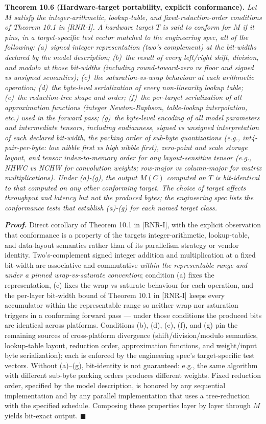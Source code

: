 \documentclass[
]{article}
\begin{document}
\textbf{Theorem 10.6 (Hardware-target portability, explicit
conformance).} \emph{Let $M$ satisfy the integer-arithmetic,
lookup-table, and fixed-reduction-order conditions of Theorem 10.1 in [RNR-I].
A hardware target $T$ is said to \emph{conform} for $M$ if it pins,
in a target-specific test vector matched to the engineering spec,
all of the following: (a)~signed integer representation (two's
complement) at the bit-widths declared by the model description;
(b)~the result of every left/right shift, division, and modulo at
those bit-widths (including round-toward-zero vs floor and signed
vs unsigned semantics); (c)~the saturation-vs-wrap behaviour at each
arithmetic operation; (d)~the byte-level serialization of every
non-linearity lookup table; (e)~the reduction-tree shape and order;
(f)~the per-target serialization of all approximation functions
(integer Newton-Raphson, table-lookup interpolation, etc.) used in
the forward pass; (g)~the byte-level encoding of all model
parameters and intermediate tensors, including endianness, signed
vs unsigned interpretation of each declared bit-width, the packing
order of sub-byte quantizations (e.g., int4-pair-per-byte: low
nibble first vs high nibble first), zero-point and scale storage
layout, and tensor index-to-memory order for any layout-sensitive
tensor (e.g., NHWC vs NCHW for convolution weights; row-major vs
column-major for matrix multiplications). Under (a)-(g), the output
$M(C)$ computed on $T$ is bit-identical to that computed on any
other conforming target. The choice of target affects throughput
and latency but not the produced bytes; the engineering spec lists
the conformance tests that establish (a)-(g) for each named target
class.}

\emph{\textbf{Proof.}} Direct corollary of Theorem 10.1 in [RNR-I], with the
explicit observation that conformance is a property of the
target\textquotesingle s integer-arithmetic, lookup-table, and
data-layout semantics rather than of its parallelism strategy or
vendor identity. Two's-complement signed integer addition and
multiplication at a fixed bit-width are associative and commutative
\emph{within the representable range and under a pinned wrap-vs-saturate
convention}; condition (a) fixes the representation, (c) fixes the
wrap-vs-saturate behaviour for each operation, and the per-layer
bit-width bound of Theorem 10.1 in [RNR-I] keeps every accumulator within the
representable range so neither wrap nor saturation triggers in a
conforming forward pass --- under those conditions the produced
bits are identical across platforms. Conditions (b), (d), (e), (f),
and (g) pin the remaining sources of cross-platform divergence
(shift/division/modulo semantics, lookup-table layout, reduction
order, approximation functions, and weight/input byte
serialization); each is enforced by the engineering spec's
target-specific test vectors. Without (a)--(g), bit-identity is
not guaranteed: e.g., the same algorithm with different sub-byte
packing orders produces different weights. Fixed reduction order,
specified by the model description, is honored by any sequential
implementation and by any parallel implementation that uses a
tree-reduction with the specified schedule. Composing these properties
layer by layer through $M$ yields bit-exact output. \hfill$\blacksquare$
\end{document}
